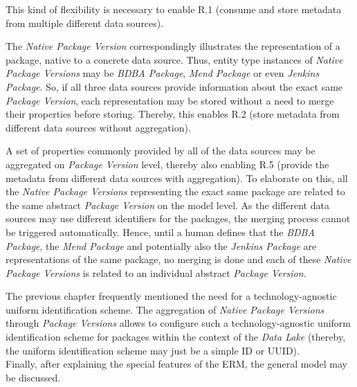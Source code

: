 This kind of flexibility is necessary to enable R.1 (consume and store metadata from multiple different data sources).\par 
The \emph{Native Package Version} correspondingly illustrates the representation of a package, native to a concrete data source. Thus, entity type instances of \emph{Native Package Versions} may be \emph{BDBA Package}, \emph{Mend Package} or even \emph{Jenkins Package}. So, if all three data sources provide information about the exact same \emph{Package Version}, each representation may be stored without a need to merge their properties before storing. Thereby, this enables R.2 (store metadata from different data sources without aggregation).\par 
A set of properties commonly provided by all of the data sources may be aggregated on \emph{Package Version} level, thereby also enabling R.5 (provide the metadata from different data sources with aggregation). To elaborate on this, all the \emph{Native Package Versions} representing the exact same package are related to the same abstract \emph{Package Version} on the model level. As the different data sources may use different identifiers for the packages, the merging process cannot be triggered automatically. Hence, until a human defines that the \emph{BDBA Package}, the \emph{Mend Package} and potentially also the \emph{Jenkins Package} are representations of the same package, no merging is done and each of these \emph{Native Package Versions} is related to an individual abstract \emph{Package Version}.\par
The previous chapter frequently mentioned the need for a technology-agnostic uniform identification scheme. The aggregation of \emph{Native Package Versions} through \emph{Package Versions} allows to configure such a technology-agnostic uniform identification scheme for packages within the context of the \emph{Data Lake} (thereby, the uniform identification scheme may just be a simple ID or UUID).\\

\noindent Finally, after explaining the special features of the ERM, the general model may be discussed.\\

